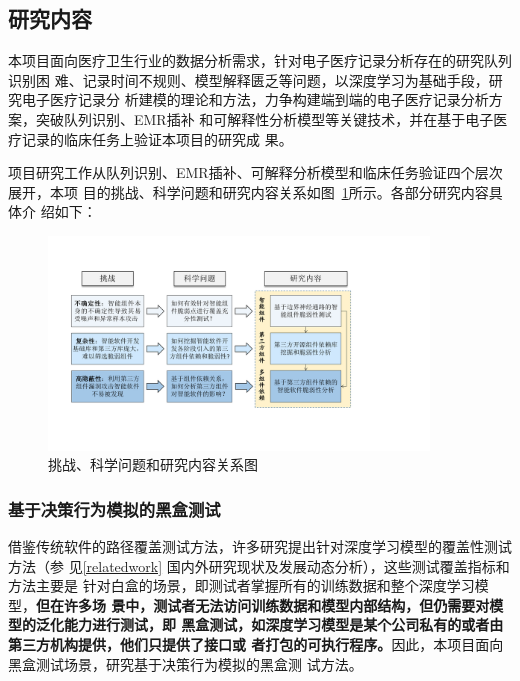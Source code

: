 \subsection{研究内容}\label{ch2content}

本项目面向医疗卫生行业的数据分析需求，针对电子医疗记录分析存在的研究队列识别困
难、记录时间不规则、模型解释匮乏等问题，以深度学习为基础手段，研究电子医疗记录分
析建模的理论和方法，力争构建端到端的电子医疗记录分析方案，突破队列识别、EMR插补
和可解释性分析模型等关键技术，并在基于电子医疗记录的临床任务上验证本项目的研究成
果。

项目研究工作从队列识别、EMR插补、可解释分析模型和临床任务验证四个层次展开，本项
目的挑战、科学问题和研究内容关系如图~\ref{fig:ch2:rc}所示。各部分研究内容具体介
绍如下：

\begin{figure}
    \begin{small}
        \begin{center}
            \includegraphics[width=0.9\textwidth]{overview.pdf}
        \end{center}
        \caption{挑战、科学问题和研究内容关系图}
        \label{fig:ch2:rc}
    \end{small}
\end{figure}

\subsubsection{基于决策行为模拟的黑盒测试}

借鉴传统软件的路径覆盖测试方法，许多研究提出针对深度学习模型的覆盖性测试方法（参
见\ref{relatedwork} 国内外研究现状及发展动态分析），这些测试覆盖指标和方法主要是
针对白盒的场景，即测试者掌握所有的训练数据和整个深度学习模型，\textbf{但在许多场
景中，测试者无法访问训练数据和模型内部结构，但仍需要对模型的泛化能力进行测试，即
黑盒测试，如深度学习模型是某个公司私有的或者由第三方机构提供，他们只提供了接口或
者打包的可执行程序。}因此，本项目面向黑盒测试场景，研究基于决策行为模拟的黑盒测
试方法。

